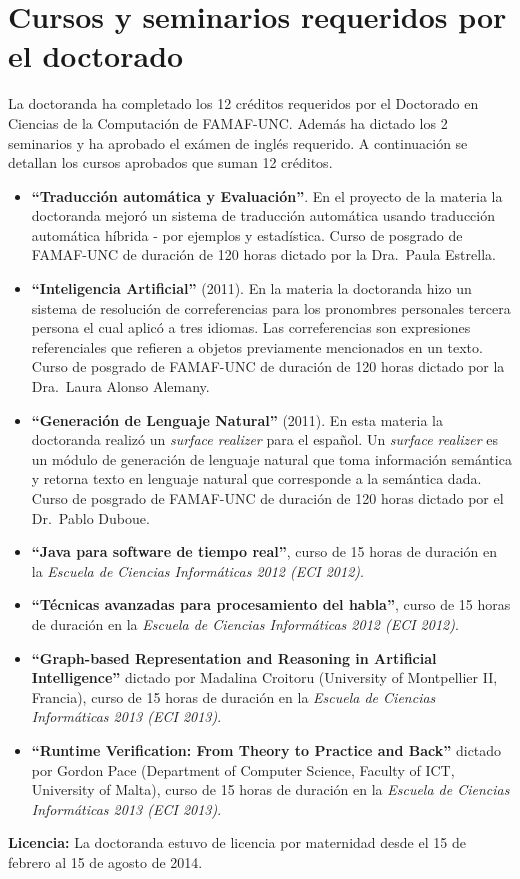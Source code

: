 \section{Cursos y seminarios requeridos por el doctorado}

La doctoranda ha completado los 12 cr\'editos requeridos por el Doctorado en Ciencias de la Computaci\'on de FAMAF-UNC. Adem\'as ha dictado los 2 seminarios y ha aprobado el ex\'amen de ingl\'es requerido. A continuaci\'on se detallan los cursos aprobados que suman 12 cr\'editos.  

\begin{itemize}
\item {\bf ``Traducci\'on autom\'atica y Evaluaci\'on''}. En el proyecto de la materia la doctoranda mejor\'o un sistema de traducci\'on autom\'atica  usando traducci\'on autom\'atica h\'ibrida - por ejemplos y estad\'istica. Curso de posgrado de FAMAF-UNC de duraci\'on de 120 horas dictado por la Dra.~Paula Estrella. 
\item {\bf ``Inteligencia Artificial''} (2011). En la materia la doctoranda hizo un sistema de resoluci\'on de correferencias para los pronombres personales tercera persona el cual aplic\'o a tres idiomas. Las correferencias son expresiones referenciales que refieren a objetos previamente mencionados en un texto. Curso de posgrado de FAMAF-UNC de duraci\'on de 120 horas dictado por la Dra.~Laura Alonso Alemany. 
\item {\bf ``Generaci\'on de Lenguaje Natural''} (2011). En esta materia la doctoranda realiz\'o un {\it surface realizer} para el espa\~{n}ol. Un {\it surface realizer} es un m\'odulo de generaci\'on de lenguaje natural que toma informaci\'on sem\'antica y retorna texto en lenguaje natural que corresponde a la sem\'antica dada. Curso de posgrado de FAMAF-UNC de duraci\'on de 120 horas dictado por el Dr.~Pablo Duboue. 
\item \textbf{``Java para software de tiempo real''}, curso de 15 horas de duraci\'on en la \emph{Escuela de Ciencias Inform\'aticas 2012 (ECI 2012)}.
\item \textbf{``T\'ecnicas avanzadas para procesamiento del habla''}, curso de 15 horas de duraci\'on en la \emph{Escuela de Ciencias Inform\'aticas 2012 (ECI 2012)}.
\item \textbf{``Graph-based Representation and Reasoning in Artificial Intelligence''} dictado por Madalina Croitoru (University of Montpellier II, Francia), curso de 15 horas de duraci\'on en la \emph{Escuela de Ciencias Inform\'aticas 2013 (ECI 2013)}.
\item \textbf{``Runtime Verification: From Theory to Practice and Back''} dictado por Gordon Pace (Department  of  Computer  Science,  Faculty  of  ICT,  University  of  Malta), curso de 15 horas de duraci\'on en la \emph{Escuela de Ciencias Inform\'aticas 2013 (ECI 2013)}.
\end{itemize}

\textbf{Licencia:}
La doctoranda estuvo de licencia por maternidad desde el 15 de febrero al 15 de agosto de 2014. 




